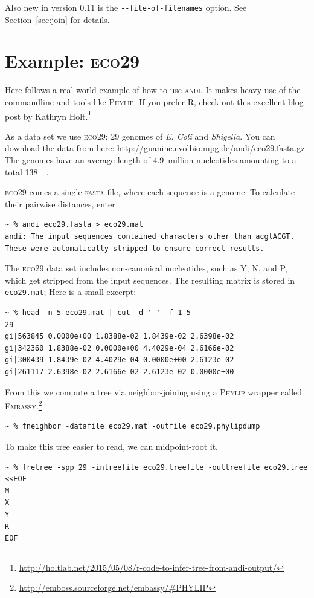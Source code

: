 \documentclass[a4paper,
  10pt,
  english,
  DIV=12,
  BCOR=8mm]{scrbook}
\newcommand{\algo}[1]{\textsc{{#1}}}
\newcommand{\word}[1]{\textsf{\small#1}}
\begin{document}
Also new in version 0.11 is the \lstinline$--file-of-filenames$ option. See Section~\ref{sec:join} for details.

\section{Example: \algo{eco29}}

Here follows a real-world example of how to use \algo{andi}. It makes heavy use of the commandline and tools like \algo{Phylip}. If you prefer \algo{R}, check out this excellent blog post by Kathryn Holt.\footnote{\url{http://holtlab.net/2015/05/08/r-code-to-infer-tree-from-andi-output/}}

As a data set we use \algo{eco29}; 29 genomes of \textit{E. Coli} and \textit{Shigella}. You can download the data from here: {\small{\url{http://guanine.evolbio.mpg.de/andi/eco29.fasta.gz}}}. The genomes have an average length of 4.9~million nucleotides amounting to a total \SI{138}{\mega\byte}.

\algo{eco29} comes a single \algo{fasta} file, where each sequence is a genome. To calculate their pairwise distances, enter

\begin{lstlisting}
~ % andi eco29.fasta > eco29.mat
andi: The input sequences contained characters other than acgtACGT. These were automatically stripped to ensure correct results.
\end{lstlisting}

\noindent The \algo{eco29} data set includes non-canonical nucleotides, such as \word{Y}, \word{N}, and \word{P}, which get stripped from the input sequences. The resulting matrix is stored in \lstinline$eco29.mat$; Here is a small excerpt:

\begin{lstlisting}
~ % head -n 5 eco29.mat | cut -d ' ' -f 1-5
29
gi|563845 0.0000e+00 1.8388e-02 1.8439e-02 2.6398e-02
gi|342360 1.8388e-02 0.0000e+00 4.4029e-04 2.6166e-02
gi|300439 1.8439e-02 4.4029e-04 0.0000e+00 2.6123e-02
gi|261117 2.6398e-02 2.6166e-02 2.6123e-02 0.0000e+00
\end{lstlisting}

\noindent From this we compute a tree via neighbor-joining using a \algo{Phylip} wrapper called \algo{Embassy}.\footnote{\url{http://emboss.sourceforge.net/embassy/\#PHYLIP}}

\begin{lstlisting}
~ % fneighbor -datafile eco29.mat -outfile eco29.phylipdump
\end{lstlisting}
\noindent To make this tree easier to read, we can midpoint-root it.
\begin{lstlisting}
~ % fretree -spp 29 -intreefile eco29.treefile -outtreefile eco29.tree <<EOF
M
X
Y
R
EOF
\end{lstlisting}
\end{document}
